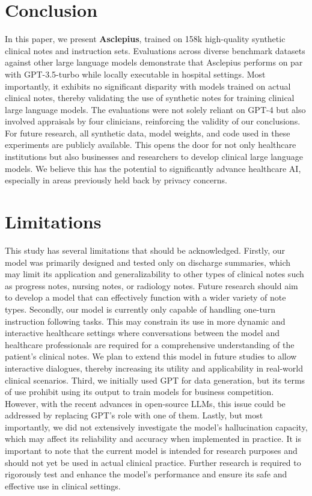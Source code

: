 \documentclass[11pt]{article}
\begin{document}
\section{Conclusion}\label{Conclusion}

In this paper, we present \textbf{Asclepius}, trained on 158k high-quality synthetic clinical notes and instruction sets.
Evaluations across diverse benchmark datasets against other large language models demonstrate that Asclepius performs on par with GPT-3.5-turbo while locally executable in hospital settings.
Most importantly, it exhibits no significant disparity with models trained on actual clinical notes, thereby validating the use of synthetic notes for training clinical large language models. 
The evaluations were not solely reliant on GPT-4 but also involved appraisals by four clinicians, reinforcing the validity of our conclusions. 
For future research, all synthetic data, model weights, and code used in these experiments are publicly available.
This opens the door for not only healthcare institutions but also businesses and researchers to develop clinical large language models. 
We believe this has the potential to significantly advance healthcare AI, especially in areas previously held back by privacy concerns.


\section*{Limitations}
This study has several limitations that should be acknowledged.
Firstly, our model was primarily designed and tested only on discharge summaries, which may limit its application and generalizability to other types of clinical notes such as progress notes, nursing notes, or radiology notes. 
Future research should aim to develop a model that can effectively function with a wider variety of note types. 
Secondly, our model is currently only capable of handling one-turn instruction following tasks. 
This may constrain its use in more dynamic and interactive healthcare settings where conversations between the model and healthcare professionals are required for a comprehensive understanding of the patient's clinical notes. 
We plan to extend this model in future studies to allow interactive dialogues, thereby increasing its utility and applicability in real-world clinical scenarios.
Third, we initially used GPT for data generation, but its terms of use prohibit using its output to train models for business competition.
However, with the recent advances in open-source LLMs, this issue could be addressed by replacing GPT's role with one of them.
Lastly, but most importantly, we did not extensively investigate the model's hallucination capacity, which may affect its reliability and accuracy when implemented in practice. 
It is important to note that the current model is intended for research purposes and should not yet be used in actual clinical practice. 
Further research is required to rigorously test and enhance the model's performance and ensure its safe and effective use in clinical settings.
\end{document}
